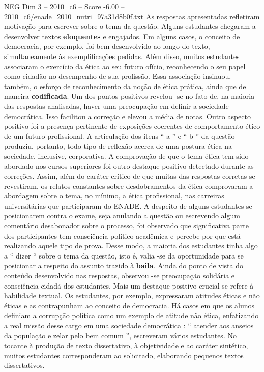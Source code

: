\begin{textsample}{NEG Dim 3 – 2010\_c6 – Score -6.00 – 2010\_c6/enade\_2010\_nutri\_97a31d8b0f.txt}
As respostas apresentadas refletiram motivação para escrever sobre o tema da questão.
Alguns estudantes chegaram a desenvolver textos \textbf{eloquentes} e engajados.
Em alguns casos, o conceito de democracia, por exemplo, foi bem desenvolvido ao longo do texto, simultaneamente às exemplificações pedidas.
Além disso, muitos estudantes associaram o exercício da ética ao seu futuro ofício, reconhecendo o seu papel como cidadão no desempenho de sua profissão.
Essa associação insinuou, também, o esforço de reconhecimento da noção de ética prática, ainda que de maneira \textbf{codificada}.
Um dos pontos positivos revelou -se no fato de, na maioria das respostas analisadas, haver uma preocupação em definir a sociedade democrática.
Isso facilitou a correção e elevou a média de notas.
Outro aspecto positivo foi a presença pertinente de exposições coerentes de comportamento ético de um futuro profissional.
A articulação dos itens “ a ” e “ b ” da questão produziu, portanto, todo tipo de reflexão acerca de uma postura ética na sociedade, inclusive, corporativa.
A comprovação de que o tema ética tem sido abordado nos cursos superiores foi outro destaque positivo detectado durante as correções.
Assim, além do caráter crítico de que muitas das respostas corretas se revestiram, os relatos constantes sobre desdobramentos da ética comprovaram a abordagem sobre o tema, no mínimo, a ética profissional, nas carreiras universitárias que participaram do ENADE.
A despeito de alguns estudantes se posicionarem contra o exame, seja anulando a questão ou escrevendo algum comentário desabonador sobre o processo, foi observado que significativa parte dos participantes tem consciência político-acadêmica e percebe por que está realizando aquele tipo de prova.
Desse modo, a maioria dos estudantes tinha algo a “ dizer “ sobre o tema da questão, isto é, valia -se da oportunidade para se posicionar a respeito do assunto trazido à \textbf{baila}.
Ainda do ponto de vista do conteúdo desenvolvido nas respostas, observou -se preocupação solidária e consciência cidadã dos estudantes.
Mais um destaque positivo crucial se refere à habilidade textual.
Os estudantes, por exemplo, expressaram atitudes éticas e não éticas e as contrapunham ao conceito de democracia.
Há casos em que os alunos definiam a corrupção política como um exemplo de atitude não ética, enfatizando a real missão desse cargo em uma sociedade democrática : “ atender aos anseios da população e zelar pelo bem comum ”, escreveram vários estudantes.
No tocante à produção de texto dissertativo, à objetividade e ao caráter sintético, muitos estudantes corresponderam ao solicitado, elaborando pequenos textos dissertativos.

\end{textsample}
